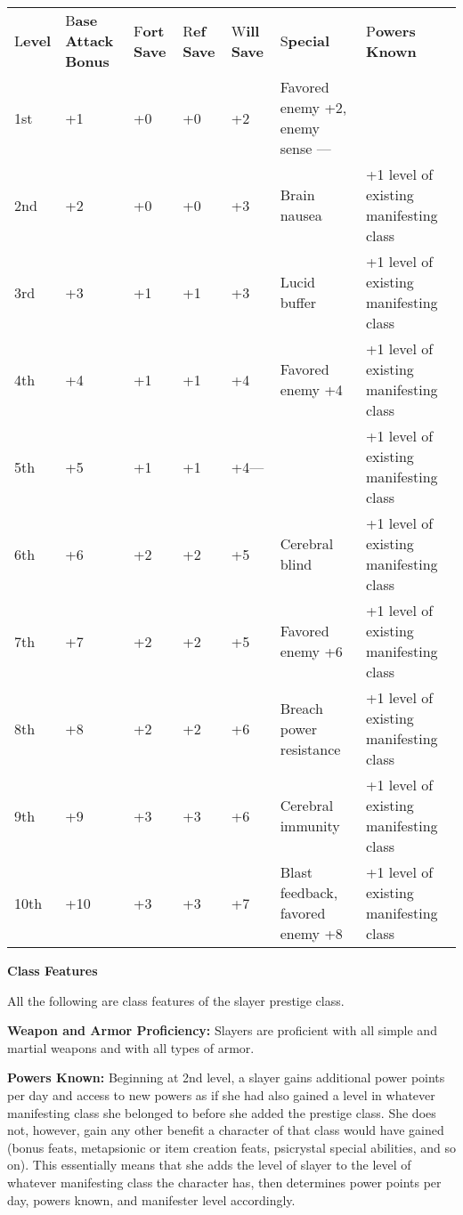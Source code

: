 \documentclass{article}
\begin{document}
\vspace{12pt}
\begin{tabular}{|>{\raggedright}p{16pt}|>{\raggedright}p{36pt}|>{\raggedright}p{14pt}|>{\raggedright}p{17pt}|>{\raggedright}p{19pt}|>{\raggedright}p{64pt}|>{\raggedright}p{97pt}|}
\hline
\multicolumn{7}{|p{266pt}|}{T\textbf{able: The Slayer}}\tabularnewline
\hline
L\textbf{evel} & B\textbf{ase Attack Bonus} & F\textbf{ort Save} & R\textbf{ef 
 Save} & W\textbf{ill Save} & S\textbf{pecial} & P\textbf{owers Known}\tabularnewline
\hline
1st & +1 & +0 & +0 & +2 & Favored enemy +2, enemy sense --- & \tabularnewline
\hline
2nd & +2 & +0 & +0 & +3 & Brain nausea & +1 level of existing manifesting class\tabularnewline
\hline
3rd & +3 & +1 & +1 & +3 & Lucid buffer & +1 level of existing manifesting class\tabularnewline
\hline
4th & +4 & +1 & +1 & +4 & Favored enemy +4 & +1 level of existing manifesting class\tabularnewline
\hline
5th & +5 & +1 & +1 & +4--- &  & +1 level of existing manifesting class\tabularnewline
\hline
6th & +6 & +2 & +2 & +5 & Cerebral blind & +1 level of existing manifesting class\tabularnewline
\hline
7th & +7 & +2 & +2 & +5 & Favored enemy +6 & +1 level of existing manifesting class\tabularnewline
\hline
8th & +8 & +2 & +2 & +6 & Breach power resistance & +1 level of existing manifesting 
class\tabularnewline
\hline
9th & +9 & +3 & +3 & +6 & Cerebral immunity & +1 level of existing manifesting 
class\tabularnewline
\hline
10th & +10 & +3 & +3 & +7 & Blast feedback, favored enemy +8 & +1 level of existing 
manifesting class\tabularnewline
\hline
\end{tabular}

\vspace{12pt}
\textbf{Class Features}

All the following are class features of the slayer prestige class.

\textbf{Weapon and Armor Proficiency: }Slayers are proficient with all simple and 
martial weapons and with all types of armor. 

\textbf{Powers Known:} Beginning at 2nd level, a slayer gains additional power 
points per day and access to new powers as if she had also gained a level in whatever 
manifesting class she belonged to before she added the prestige class. She does 
not, however, gain any other benefit a character of that class would have gained 
(bonus feats, metapsionic or item creation feats, psicrystal special abilities, 
and so on). This essentially means that she adds the level of slayer to the level 
of whatever manifesting class the character has, then determines power points per 
day, powers known, and manifester level accordingly.
\end{document}
